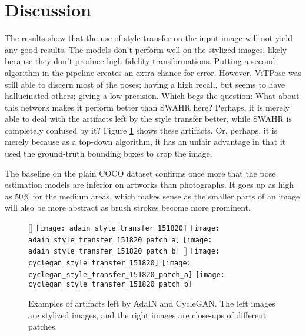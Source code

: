 \section{Discussion}
\label{sec:baseline_human_art_discussion}
The results show that the use of style transfer on the input image will not yield any good results.
The models don't perform well on the stylized images, likely because they don't produce high-fidelity transformations.
Putting a second algorithm in the pipeline creates an extra chance for error.
However, ViTPose was still able to discern most of the poses; having a high recall, but seems to have hallucinated others; giving a low precision.
Which begs the question: What about this network makes it perform better than SWAHR here?
Perhaps, it is merely able to deal with the artifacts left by the style transfer better, while SWAHR is completely confused by it?
Figure \ref{fig:baseline_style_transfer_artifacts} shows these artifacts.
Or, perhaps, it is merely because as a top-down algorithm, it has an unfair advantage in that it used the ground-truth bounding boxes to crop the image.

The baseline on the plain COCO dataset confirms once more that the pose estimation models are inferior on artworks than photographs.
It goes up as high as 50\% for the medium areas, which makes sense as the smaller parts of an image will also be more abstract as brush strokes become more prominent.

\begin{figure}
    \centering
	[\textwidth]{
		\texttt{[image: adain\_style\_transfer\_151820]}
		\texttt{[image: adain\_style\_transfer\_151820\_patch\_a]}
		\texttt{[image: adain\_style\_transfer\_151820\_patch\_b]}
    }
    [\textwidth]{
		\texttt{[image: cyclegan\_style\_transfer\_151820]}
		\texttt{[image: cyclegan\_style\_transfer\_151820\_patch\_a]}
		\texttt{[image: cyclegan\_style\_transfer\_151820\_patch\_b]}
	}
	\caption{
        Examples of artifacts left by AdaIN and CycleGAN. The left images are stylized images, and the right images are close-ups of different patches.
    }
    \label{fig:baseline_style_transfer_artifacts}
\end{figure}